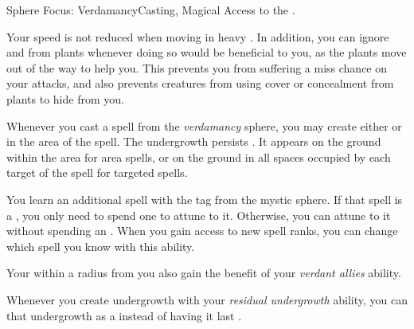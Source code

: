     \begin{feat}{Sphere Focus: Verdamancy}{Casting, Magical}
        \featpre Access to the  .

         Your speed is not reduced when moving in heavy .
        In addition, you can ignore  and  from plants whenever doing so would be beneficial to you, as the plants move out of the way to help you.
        This prevents you from suffering a miss chance on your attacks, and also prevents creatures from using cover or concealment from plants to hide from you.

         Whenever you cast a spell from the \textit{verdamancy} sphere, you may create either  or  in the area of the spell.
        The undergrowth persists .
        It appears on the ground within the area for area spells, or on the ground in all spaces occupied by each target of the spell for targeted spells.

         You learn an additional spell with the  tag from the  mystic sphere.
        If that spell is a , you only need to spend one  to attune to it.
        Otherwise, you can attune to it without spending an .
        When you gain access to new spell ranks, you can change which spell you know with this ability.

         Your  within a \largearea radius  from you also gain the benefit of your \textit{verdant allies} ability.

         Whenever you create undergrowth with your \textit{residual undergrowth} ability, you can  that undergrowth as a  instead of having it last .
    \end{feat}

